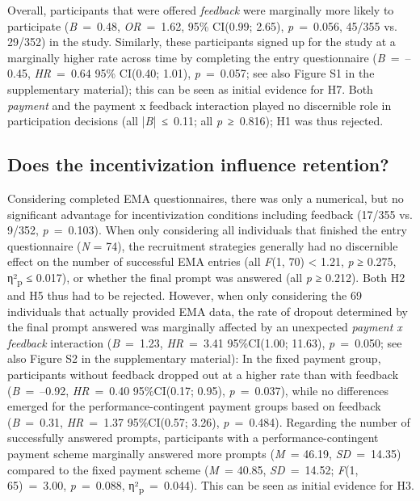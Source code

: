 \documentclass[authordate, empirical]{jote-new-article}
\begin{document}
	Overall, participants that were offered \emph{feedback} were marginally more likely to participate (\emph{B} = 0.48, \emph{OR} = 1.62, 95\% CI(0.99; 2.65), \emph{p} = 0.056, 45/355 vs. 29/352) in the study. Similarly, these participants signed up for the study at a marginally higher rate across time by completing the entry questionnaire (\emph{B} = --0.45, \emph{HR} = 0.64 95\% CI(0.40; 1.01), \emph{p} = 0.057; see also Figure S1 in the supplementary material); this can be seen as initial evidence for H7. Both \emph{payment} and the payment x feedback interaction played no discernible role in participation decisions (all |\emph{B}| ≤ 0.11; all \emph{p} ≥ 0.816); H1 was thus rejected.



	\subsection{Does the incentivization influence retention?}



	Considering completed EMA questionnaires, there was only a numerical, but no significant advantage for incentivization conditions including feedback (17/355 vs. 9/352, \emph{p} = 0.103). When only considering all individuals that finished the entry questionnaire (\emph{N} = 74), the recruitment strategies generally had no discernible effect on the number of successful EMA entries (all \emph{F}(1, 70) < 1.21, \emph{p} ≥ 0.275, η²\textsubscript{p} ≤ 0.017), or whether the final prompt was answered (all \emph{p} ≥ 0.212). Both H2 and H5 thus had to be rejected. However, when only considering the 69 individuals that actually provided EMA data, the rate of dropout determined by the final prompt answered was marginally affected by an unexpected \emph{payment x feedback }interaction (\emph{B} = 1.23, \emph{HR} = 3.41 95\%CI(1.00; 11.63), \emph{p} = 0.050; see also Figure S2 in the supplementary material): In the fixed payment group, participants without feedback dropped out at a higher rate than with feedback (\emph{B }= --0.92, \emph{HR} = 0.40 95\%CI(0.17; 0.95), \emph{p} = 0.037), while no differences emerged for the performance-contingent payment groups based on feedback (\emph{B} = 0.31, \emph{HR} = 1.37 95\%CI(0.57; 3.26), \emph{p} = 0.484). Regarding the number of successfully answered prompts, participants with a performance-contingent payment scheme marginally answered more prompts (\emph{M }= 46.19, \emph{SD }= 14.35) compared to the fixed payment scheme (\emph{M }= 40.85, \emph{SD }= 14.52; \emph{F}(1, 65) = 3.00, \emph{p} = 0.088, η²\textsubscript{p} = 0.044). This can be seen as initial evidence for H3.
\end{document}
